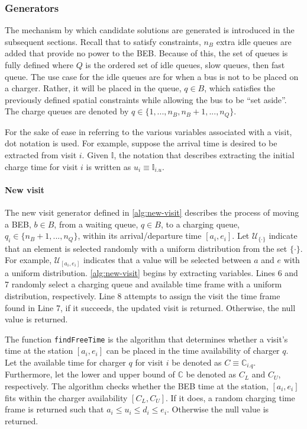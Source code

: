 \documentclass[energies,article,submit,moreauthors]{Definitions/mdpi}
\newcommand{\I}{\mathbb{I}}                 %
\newcommand{\C}{\mathbb{C}}                 %
\newcommand{\U}{\mathcal{U}}                %
\begin{document}
\subsubsection{Generators}
\label{sec:sa-generators}
The mechanism by which candidate solutions are generated is introduced in the subsequent sections. Recall that to
satisfy constraints, \(n_B\) extra idle queues are added that provide no power to the BEB. Because of this, the set of
queues is fully defined where \(Q\) is the ordered set of idle queues, slow queues, then fast queue. The use case for the
idle queues are for when a bus is not to be placed on a charger. Rather, it will be placed in the queue, \(q \in B\), which
satisfies the previously defined spatial constraints while allowing the bus to be ``set aside''. The charge queues are
denoted by \(q \in \{1, ..., n_B , n_B + 1, ..., n_Q\}\).

For the sake of ease in referring to the various variables associated with a visit, dot notation is used. For example,
suppose the arrival time is desired to be extracted from visit \(i\). Given \(\I\), the notation that describes extracting
the initial charge time for visit \(i\) is written as \(u_i \equiv \I_{i.u}\).

\paragraph{New visit}
\label{sec:sa-new-visit}
The new visit generator defined in \ref{alg:new-visit} describes the process of moving a BEB, \(b \in B\), from a waiting
queue, \(q \in B\), to a charging queue, \(q_i \in \{n_B + 1, ..., n_Q\}\), within its arrival/departure time \([a_i, e_i]\). Let
\(\U_{\{\cdot\}}\) indicate that an element is selected randomly with a uniform distribution from the set \(\{\cdot\}\). For
example, \(\U_{[a_i, e_i]}\) indicates that a value will be selected between \(a\) and \(e\) with a uniform distribution.
\ref{alg:new-visit} begins by extracting variables. Lines 6 and 7 randomly select a charging queue and available time
frame with a uniform distribution, respectively. Line 8 attempts to assign the visit the time frame found in Line 7, if
it succeeds, the updated visit is returned. Otherwise, the null value is returned.

The function \texttt{findFreeTime} is the algorithm that determines whether a visit's time at the station \([a_i, e_i]\) can be placed
in the time availability of charger \(q\). Let the available time for charger \(q\) for visit \(i\) be denoted as \(C \equiv
\C_{i.q}\). Furthermore, let the lower and upper bound of \(\C\) be denoted as \(C_L\) and \(C_U\), respectively. The algorithm
checks whether the BEB time at the station, \([a_i, e_i]\) fits within the charger availability \([C_L, C_U]\). If it does,
a random charging time frame is returned such that \(a_i \le u_i \le d_i \le e_i\). Otherwise the null value is returned.
\end{document}
